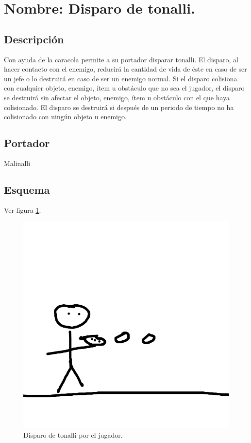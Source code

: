 \section{Nombre: Disparo de tonalli.}\label{hab.disparoT}
\subsection{Descripción}
Con ayuda de la caracola permite a su portador disparar tonalli. El disparo, al hacer contacto con el enemigo, reducirá la cantidad de vida de éste en caso de ser un jefe o lo destruirá en caso de ser un enemigo normal. Si el disparo colisiona con cualquier objeto, enemigo, ítem u obstáculo que no sea el jugador, el disparo se destruirá sin afectar el objeto, enemigo, ítem u obstáculo con el que haya colisionado. El disparo se destruirá si después de un periodo de tiempo no ha colisionado con ningún objeto u enemigo.
\subsection{Portador}
Malinalli
\subsection{Esquema}
			Ver figura \ref{fig:disparoT}.
			\begin{figure}
				\centering
				\includegraphics[height=0.2 \textheight]{Imagenes/disparoT}
				\caption{Disparo de tonalli por el jugador.}
				\label{fig:disparoT}
			\end{figure}